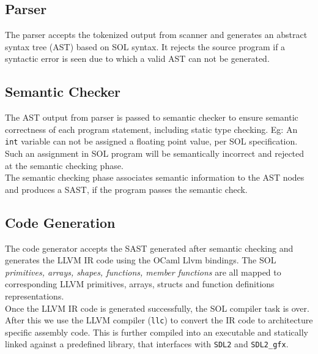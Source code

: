 \documentclass[letterpaper,12pt]{report}
\begin{document}
    \subsection{Parser}
      The parser accepts the tokenized output from scanner and generates an abstract syntax tree (AST) based on SOL syntax. It rejects the source program if a syntactic error is seen due to which a valid AST can not be generated.

    \subsection{Semantic Checker}
      The AST output from parser is passed to semantic checker to ensure semantic correctness of each program statement, including static type checking. Eg: An \texttt{int} variable can not be assigned a floating point value, per SOL specification. Such an assignment in SOL program will be semantically incorrect and rejected at the semantic checking phase.\\
      The semantic checking phase associates semantic information to the AST nodes and produces a SAST, if the program passes the semantic check.

    \subsection{Code Generation}
    The code generator accepts the SAST generated after semantic checking and generates the LLVM IR code using the OCaml Llvm bindings. The SOL \textit{primitives, arrays, shapes, functions, member functions} are all mapped to corresponding LLVM primitives, arrays, structs and function definitions representations.\\
    Once the LLVM IR code is generated successfully, the SOL compiler task is over. After this we use the LLVM compiler (\texttt{llc}) to convert the IR code to architecture specific assembly code. This is further compiled into an executable and statically linked against a predefined library, that interfaces with \texttt{SDL2} and \texttt{SDL2\_gfx}. 
\end{document}
